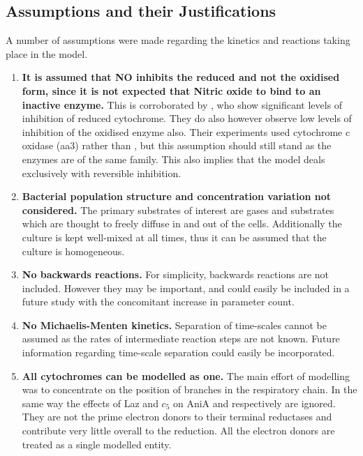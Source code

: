 \subsection{Assumptions and their Justifications}
A number of assumptions were made regarding the kinetics and reactions taking place in the model.
\begin{enumerate}
 \item {\bf It is assumed that NO inhibits the reduced \cbbthree{} and not the oxidised form, since it is not expected that Nitric oxide to bind to an inactive enzyme.} This is corroborated by \citet{Giuffre2000}, who show significant levels of inhibition of reduced cytochrome. They do also however observe low levels of inhibition of the oxidised enzyme also. Their experiments used cytochrome c oxidase (aa3) rather than \cbbthree{}, but this assumption should still stand as the enzymes are of the same family. This also implies that the model deals exclusively with reversible inhibition.
 \item {\bf Bacterial population structure and concentration variation not considered.} The primary substrates of interest are gases and substrates which are thought to freely diffuse in and out of the cells. Additionally the culture is kept well-mixed at all times, thus it can be assumed that the culture is homogeneous.
 \item {\bf No backwards reactions.} For simplicity, backwards reactions are not included. However they may be important, and could easily be included in a future study with the concomitant increase in parameter count.
 \item {\bf No Michaelis-Menten kinetics.} Separation of time-scales cannot be assumed as the rates of intermediate reaction steps are not known. Future information regarding time-scale separation could easily be incorporated.
 \item {\bf All cytochromes can be modelled as one.} The main effort of modelling was to concentrate on the position of branches in the respiratory chain. In the same way the effects of Laz and $c_5$ on AniA and \cbbthree{} respectively are ignored. They are not the prime electron donors to their terminal reductases and contribute very little overall to the reduction\cite{Deeudom2007}. All the electron donors are treated as a single modelled entity.
\end{enumerate}


